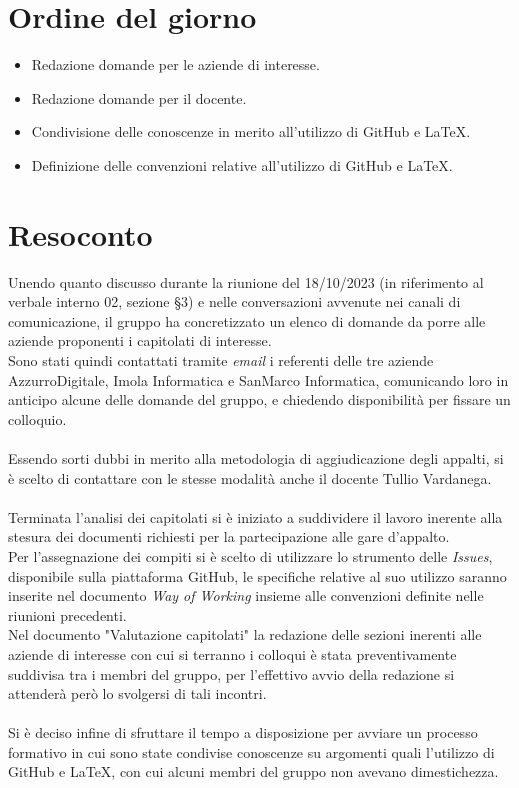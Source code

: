 \section{Ordine del giorno}
\begin{itemize}
    \item Redazione domande per le aziende di interesse.
    \item Redazione domande per il docente.
    \item Condivisione delle conoscenze in merito all'utilizzo di GitHub e LaTeX.
    \item Definizione delle convenzioni relative all'utilizzo di GitHub e LaTeX.
\end{itemize}

\section{Resoconto}
Unendo quanto discusso durante la riunione del 18/10/2023 (in riferimento al verbale interno 02, sezione \S3) e nelle conversazioni avvenute nei canali di comunicazione, il gruppo ha concretizzato un elenco di domande da porre alle aziende proponenti i capitolati di interesse.\\
\noindent
Sono stati quindi contattati tramite \textit{email} i referenti delle tre aziende AzzurroDigitale, Imola Informatica e SanMarco Informatica, comunicando loro in anticipo alcune delle domande del gruppo, e chiedendo disponibilità per fissare un colloquio.\\
\noindent
\\
Essendo sorti dubbi in merito alla metodologia di aggiudicazione degli appalti, si è scelto di contattare con le stesse modalità anche il docente Tullio Vardanega.\\
\noindent
\\
Terminata l'analisi dei capitolati si è iniziato a suddividere il lavoro inerente alla stesura dei documenti richiesti per la partecipazione alle gare d'appalto.\\
\noindent
Per l'assegnazione dei compiti si è scelto di utilizzare lo strumento delle \textit{Issues}, disponibile sulla piattaforma GitHub, le specifiche relative al suo utilizzo saranno inserite nel documento \textit{Way of Working} insieme alle convenzioni definite nelle riunioni precedenti.\\
\noindent
Nel documento "Valutazione capitolati" la redazione delle sezioni inerenti alle aziende di interesse con cui si terranno i colloqui è stata preventivamente suddivisa tra i membri del gruppo, per l'effettivo avvio della redazione si attenderà però lo svolgersi di tali incontri.\\
\noindent
\\
Si è deciso infine di sfruttare il tempo a disposizione per avviare un processo formativo in cui sono state condivise conoscenze su argomenti quali l'utilizzo di GitHub e LaTeX, con cui alcuni membri del gruppo non avevano dimestichezza.

